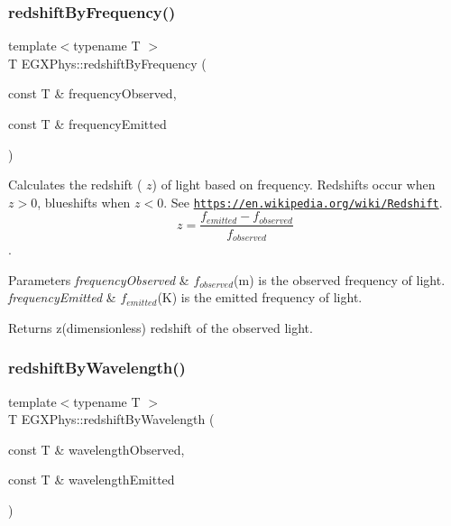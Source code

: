 \subsubsection{\texorpdfstring{redshift\+By\+Frequency()}{redshiftByFrequency()}}
{\footnotesize\ttfamily template$<$typename T $>$ \\
T E\+G\+X\+Phys\+::redshift\+By\+Frequency (\begin{DoxyParamCaption}\item[{const T \&}]{frequency\+Observed,  }\item[{const T \&}]{frequency\+Emitted }\end{DoxyParamCaption})}



Calculates the redshift ( $z$) of light based on frequency. Redshifts occur when $z > 0$, blueshifts when $z < 0$. See \href{https://en.wikipedia.org/wiki/Redshift}{\tt https\+://en.\+wikipedia.\+org/wiki/\+Redshift}. \[z=\frac{f_{emitted}-f_{observed}}{f_{observed}}\]. 


\begin{DoxyParams}{Parameters}
{\em frequency\+Observed} & $f_{observed}$(m) is the observed frequency of light. \\
\hline
{\em frequency\+Emitted} & $f_{emitted}$(K) is the emitted frequency of light. \\
\hline
\end{DoxyParams}
\begin{DoxyReturn}{Returns}
z(dimensionless) redshift of the observed light. 
\end{DoxyReturn}
\mbox{\label{group___optics_ga29300a13e34da35332ca2d447b5ce82d}} 
\subsubsection{\texorpdfstring{redshift\+By\+Wavelength()}{redshiftByWavelength()}}
{\footnotesize\ttfamily template$<$typename T $>$ \\
T E\+G\+X\+Phys\+::redshift\+By\+Wavelength (\begin{DoxyParamCaption}\item[{const T \&}]{wavelength\+Observed,  }\item[{const T \&}]{wavelength\+Emitted }\end{DoxyParamCaption})}



